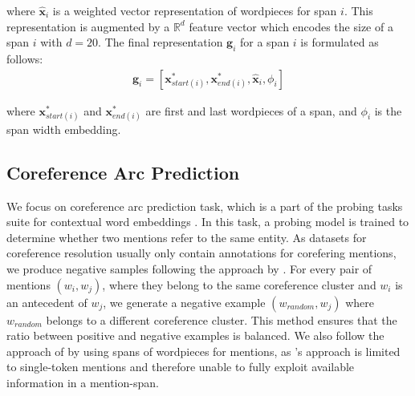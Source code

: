 \documentclass[11pt]{article}
\begin{document}
where $\hat{\pmb{x}}_{i}$ is a weighted vector representation of wordpieces for span $i$. This representation is augmented by a $\mathbb{R}^{d}$ feature vector which encodes the size of a span $i$ with $d = 20$. The final representation $\pmb{g}_{i}$ for a span $i$ is formulated as follows:
\begin{align}
\pmb{g}_{i} = [\pmb{x}_{start(i)}^{*}, \pmb{x}_{end(i)}^{*}, \hat{\pmb{x}}_{i}, \phi_{i}]
\end{align}  

where $\pmb{x}_{start(i)}^{*}$ and $\pmb{x}_{end(i)}^{*}$ are first and last wordpieces of a span, and $\phi_{i}$ is the span width embedding.

\subsection{Coreference Arc Prediction}
\label{subsection:corefarc}



We focus on coreference arc prediction task, which is a part of the probing tasks suite for contextual word embeddings \parencite{liu2019linguistic, tenney2019context}. In this task, a probing model is trained to determine whether two mentions refer to the same entity. As datasets for coreference resolution usually only contain annotations for corefering mentions, we produce negative samples following the approach by \textcite{liu2019linguistic}. For every pair of mentions $(w_{i}, w_{j})$, where they belong to the same coreference cluster and $w_{i}$ is an antecedent of $w_{j}$, we generate a negative example $(w_{random}, w_{j})$ where $w_{random}$ belongs to a different coreference cluster. This method ensures that the ratio between positive and negative examples is balanced. We also follow the approach of \textcite{tenney2019context} by using spans of wordpieces for mentions, as \textcite{liu2019linguistic}'s approach is limited to single-token mentions and therefore unable to fully exploit available information in a mention-span.
\end{document}
